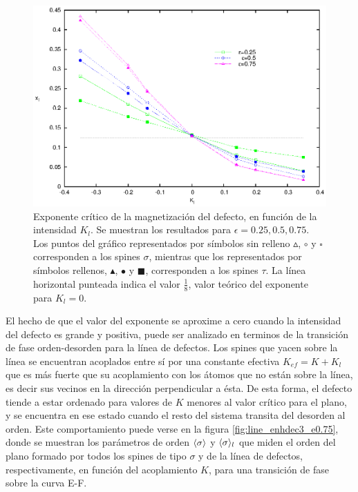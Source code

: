 \begin{figure}[h!]
\begin{center}
\includegraphics[width=\figwidth]{graf/exp/exp_all_01.eps}
\end{center}
\caption{Exponente crítico de la magnetización del defecto, en función de la intensidad $K_{l}$. Se muestran los resultados para $\epsilon=0.25,0.5,0.75$.
Los puntos del gráfico representados por símbolos sin relleno $\vartriangle$, $\circ$ y $\square$ corresponden a los spines $\sigma$, mientras que los 
representados por símbolos rellenos, $\blacktriangle$, $\bullet$ y $\blacksquare$, corresponden a los spines $\tau$. La línea horizontal punteada
indica el valor $\frac{1}{8}$, valor teórico del exponente para $K_{l}=0$.}
\label{fig:exps_st_all}
\end{figure}

El hecho de que el valor del exponente se aproxime a cero cuando la intensidad del defecto es grande y positiva, puede ser analizado
 en terminos de la transici\'on de fase orden-desorden para la l\'inea de defectos. Los spines que yacen sobre la l\'inea
 se encuentran acoplados entre s\'i por una constante efectiva $K_{ef}=K+K_{l}$ que es m\'as fuerte que su acoplamiento
 con los \'atomos que no est\'an sobre la l\'inea, es decir sus vecinos en la direcci\'on perpendicular a ésta. De esta forma,
 el defecto tiende a estar ordenado para valores de $K$ menores al valor cr\'itico para el plano, y se encuentra en ese estado cuando
 el resto del sistema transita del desorden al orden. Este comportamiento puede verse en la figura \ref{fig:line_enhdec3_e0.75}, donde
 se muestran los par\'ametros de orden $\langle \sigma \rangle$ y $\langle \sigma \rangle_{l}$ que miden el orden del plano formado por todos los spines
 de tipo $\sigma$ y de la l\'inea de defectos, respectivamente, en funci\'on del acoplamiento $K$, para una transici\'on de fase sobre
 la curva E-F.\\

